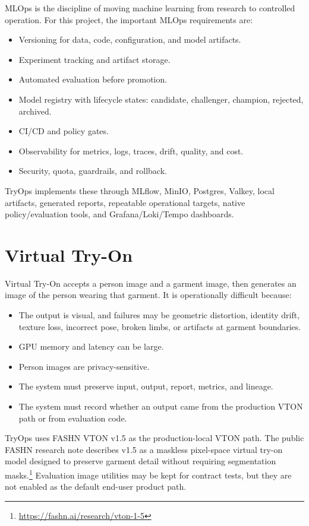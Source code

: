\documentclass[12pt,a4paper,oneside]{report}
\begin{document}
MLOps is the discipline of moving machine learning from research to controlled operation. For this project, the important MLOps requirements are:

\begin{itemize}
  \item Versioning for data, code, configuration, and model artifacts.
  \item Experiment tracking and artifact storage.
  \item Automated evaluation before promotion.
  \item Model registry with lifecycle states: candidate, challenger, champion, rejected, archived.
  \item CI/CD and policy gates.
  \item Observability for metrics, logs, traces, drift, quality, and cost.
  \item Security, quota, guardrails, and rollback.
\end{itemize}

TryOps implements these through MLflow, MinIO, Postgres, Valkey, local artifacts, generated reports, repeatable operational targets, native policy/evaluation tools, and Grafana/Loki/Tempo dashboards.

\section{Virtual Try-On}

Virtual Try-On accepts a person image and a garment image, then generates an image of the person wearing that garment. It is operationally difficult because:

\begin{itemize}
  \item The output is visual, and failures may be geometric distortion, identity drift, texture loss, incorrect pose, broken limbs, or artifacts at garment boundaries.
  \item GPU memory and latency can be large.
  \item Person images are privacy-sensitive.
  \item The system must preserve input, output, report, metrics, and lineage.
  \item The system must record whether an output came from the production VTON path or from evaluation code.
\end{itemize}

TryOps uses FASHN VTON v1.5 as the production-local VTON path. The public FASHN research note describes v1.5 as a maskless pixel-space virtual try-on model designed to preserve garment detail without requiring segmentation masks.\footnote{\url{https://fashn.ai/research/vton-1-5}} Evaluation image utilities may be kept for contract tests, but they are not enabled as the default end-user product path.
\end{document}
